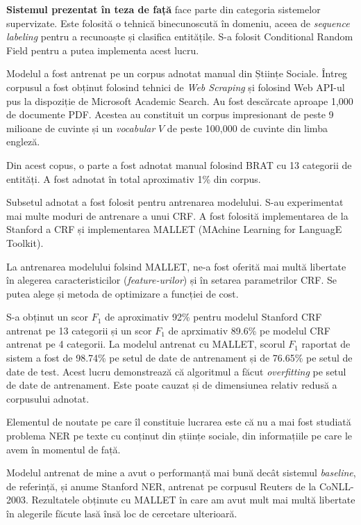 \textbf{Sistemul prezentat în teza de față} face parte din categoria sistemelor supervizate. Este folosită o tehnică binecunoscută în domeniu, aceea de \textit{sequence labeling} pentru a recunoaște și clasifica entitățile. S-a folosit Conditional Random Field pentru a putea implementa acest lucru. 

Modelul a fost antrenat pe un corpus adnotat manual din Științe Sociale. Întreg corpusul a fost obținut folosind tehnici de \textit{Web Scraping} și folosind Web API-ul pus la dispoziție de Microsoft Academic Search. Au fost descărcate aproape 1,000 de documente PDF. Acestea au constituit un corpus impresionant de peste 9 milioane de cuvinte și un \textit{vocabular} $V$ de peste 100,000 de cuvinte din limba engleză.

Din acest copus, o parte a fost adnotat manual folosind BRAT cu 13 categorii de entități. A fost adnotat în total aproximativ 1\% din corpus.

Subsetul adnotat a fost folosit pentru antrenarea modelului. S-au experimentat mai multe moduri de antrenare a unui CRF. A fost folosită implementarea de la Stanford a CRF și implementarea MALLET (MAchine Learning for LanguagE Toolkit). 

La antrenarea modelului folsind MALLET, ne-a fost oferită mai multă libertate în alegerea caracteristicilor (\textit{feature-urilor}) și în setarea parametrilor CRF. Se putea alege și metoda de optimizare a funcției de cost.

S-a obținut un scor $F_1$ de aproximativ 92\% pentru modelul Stanford CRF antrenat pe 13 categorii și un scor $F_1$ de aprximativ 89.6\% pe modelul CRF antrenat pe 4 categorii. La modelul antrenat cu MALLET, scorul $F_1$ raportat de sistem a fost de 98.74\% pe setul de date de antrenament și de 76.65\% pe setul de date de test. Acest lucru demonstrează că algoritmul a făcut \textit{overfitting} pe setul de date de antrenament. Este poate cauzat și de dimensiunea relativ redusă a corpusului adnotat.

Elementul de noutate pe care îl constituie lucrarea este că nu a mai fost studiată problema NER pe texte cu conținut din științe sociale, din informațiile pe care le avem în momentul de față.

Modelul antrenat de mine a avut o performanță mai bună decât sistemul \textit{baseline}, de referință, și anume Stanford NER, antrenat pe corpusul Reuters de la CoNLL-2003. Rezultatele obținute cu MALLET în care am avut mult mai multă libertate în alegerile făcute lasă însă loc de cercetare ulterioară.

